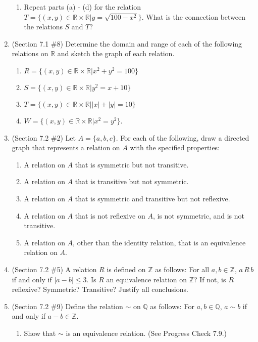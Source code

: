\documentclass[letterpaper,12pt]{article}
\newcommand{\R}[2]{#1 \, R \, #2}
\begin{document}
\begin{enumerate}
\begin{enumerate}
 \item Repeat parts (a) - (d) for the relation $T=\{(x,y)\in \mathbb{R}\times\mathbb{R} | y=\sqrt{100-x^2}\}$. What is the connection between the relations $S$ and $T$?
\end{enumerate}
\item (Section 7.1 \#8) Determine the domain and range of each of the following relations on $\mathbb{R}$ and sketch the graph of each relation.
\begin{enumerate}
 \item $R= \{(x,y)\in \mathbb{R}\times \mathbb{R} | x^2+y^2=100\}$
 \item $S=\{(x,y)\in \mathbb{R}\times \mathbb{R} | y^2=x+10\}$
 \item $T=\{(x,y)\in \mathbb{R}\times \mathbb{R} | \lvert x\rvert + \lvert y\rvert = 10\}$
 \item $W=\{(x,y)\in \mathbb{R}\times \mathbb{R} | x^2=y^2\}$.
\end{enumerate}
 \item (Section 7.2 \#2) Let $A=\{a,b,c\}$. For each of the following, draw a directed graph that represents a relation on $A$ with the specified properties:
\begin{enumerate}
 \item A relation on $A$ that is symmetric but not transitive.
 \item A relation on $A$ that is transitive but not symmetric.
 \item A relation on $A$ that is symmetric and transitive but not reflexive.
 \item A relation on $A$ that is not reflexive on $A$, is not symmetric, and is not transitive.
 \item A relation on $A$, other than the identity relation, that is an equivalence relation on $A$.
\end{enumerate}
 \item (Section 7.2 \#5) A relation $R$ is defined on $\mathbb{Z}$ as follows: For all $a,b\in\mathbb{Z}$, $\R{a}{b}$ if and only if $\lvert a -b \rvert \leq 3$. Is $R$ an equivalence relation on $\mathbb{Z}$? If not, is $R$ reflexive? Symmetric? Transitive? Justify all conclusions.
 \item (Section 7.2 \#9) Define the relation $\sim$ on $\mathbb{Q}$ as follows: For $a,b\in\mathbb{Q}$, $a\sim b$ if and only if $a-b\in\mathbb{Z}$.
\begin{enumerate}
 \item Show that $\sim$ is an equivalence relation. (See Progress Check 7.9.)

\end{enumerate}
\end{enumerate}
\end{document}
